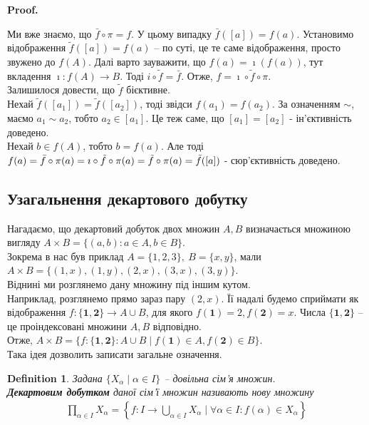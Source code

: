 \documentclass[a4paper, 14pt]{extarticle}
\makeatletter
\theoremstyle{theoremdd}
\theoremstyle{theoremdd}
\newtheorem{definition}[theorem]{Definition}
\theoremstyle{theoremdd}
\theoremstyle{theoremdd}
\theoremstyle{theoremdd}
\theoremstyle{theoremdd}
\theoremstyle{theoremdd}
\theoremstyle{theoremdd}
\theoremstyle{theoremdd}
\theoremstyle{theoremdd}
\theoremstyle{theoremdd}
\theoremstyle{theoremdd}
\theoremstyle{theoremdd}
\theoremstyle{theoremdd}
\theoremstyle{theoremdd}
\renewenvironment{proof}[1][Proof.\\]{\par
\pushQED{\hfill \qed}%
\normalfont \topsep6\p@\@plus6\p@\relax
\trivlist
\item\relax
{\bfseries
#1\@addpunct{.}}\hspace\labelsep\ignorespaces
}{%
\popQED\endtrivlist\@endpefalse
}
\makeatother
\begin{document}
\begin{proof}
Ми вже знаємо, що $\bar{f} \circ \pi = f$. У цьому випадку $\bar{f}([a]) = f(a)$. Установимо відображення $\tilde{f}([a]) = f(a)$ -- по суті, це те саме відображення, просто звужено до $f(A)$. Далі варто зауважити, що $f(a) = \imath (f(a))$, тут вкладення $\imath \colon f(A) \to B$. Тоді $i \circ \tilde{f} = \bar{f}$. Отже, $f = \imath \circ \tilde{f} \circ \pi$.\\
Залишилося довести, що $\tilde{f}$ бієктивне.\\
Нехай $\tilde{f}([a_1]) = \tilde{f}([a_2])$, тоді звідси $f(a_1) = f(a_2)$. За означенням $\sim$, маємо $a_1 \sim a_2$, тобто $a_2 \in [a_1]$. Це теж саме, що $[a_1] = [a_2]$ - ін'єктивність доведено.\\
Нехай $b \in f(A)$, тобто $b = f(a)$. Але тоді $f(a) = \bar{f} \circ \pi (a) = \imath \circ \tilde{f} \circ \pi(a) \\ = \tilde{f} \circ \pi(a) = \tilde{f}([a])$ - сюр'єктивність доведено.
\end{proof}

\subsection{Узагальнення декартового добутку}
Нагадаємо, що декартовий добуток двох множин $A,B$ визначається множиною вигляду $A \times B = \{(a,b) : a \in A, b \in B \}$.\\
Зокрема в нас був приклад $A = \{1,2,3\},\ B = \{x,y\}$, мали\\
$A \times B = \{ (1,x),(1,y),(2,x),(3,x),(3,y)\}$.\\
Віднині ми розглянемо дану множину під іншим кутом. \\
Наприклад, розглянемо прямо зараз пару $(2,x)$. Її надалі будемо сприймати як відображення $f \colon \{\textbf{1},\textbf{2}\} \to A \cup B$, для якого $f(\textbf{1}) = 2, f(\textbf{2}) = x$. Числа $\{\textbf{1}, \textbf{2}\}$ -- це проіндексовані множини $A,B$ відповідно.\\
Отже, $A \times B = \{f \colon \{\textbf{1},\textbf{2}\} \colon A \cup B \mid f(\textbf{1}) \in A, f(\textbf{2}) \in B\}$.\\
Така ідея дозволить записати загальне означення.

\begin{definition}
Задана $\{X_\alpha \mid \alpha \in I\}$ -- довільна сім'я множин.\\
\textbf{Декартовим добутком} даної сім'ї множин називають нову множину
\begin{align*}
\prod_{\alpha \in I} X_\alpha = \left\{ f \colon I \to \bigcup_{\alpha \in I} X_\alpha \mid \forall \alpha \in I: f(\alpha) \in X_\alpha \right\}
\end{align*}
\end{definition}
\end{document}
